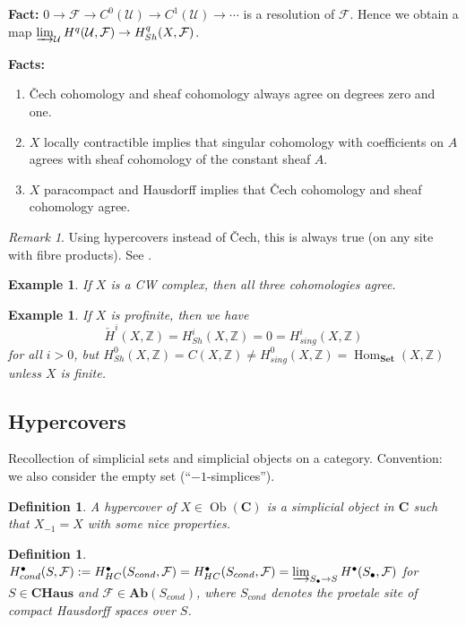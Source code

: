 \documentclass[12pt]{article}
\theoremstyle{darkgreentheorem}
\theoremstyle{darkbluedefinition}
\newtheorem{defn}[thm]{Definition}
\theoremstyle{darkredexample}
\newtheorem{exa}[thm]{Example}
\theoremstyle{remark}
\newtheorem{rem}[thm]{Remark}
\newcommand{\Z}{\mathbb{Z}}
\newcommand{\1}{\mathbbm{1}}
\newcommand{\bfC}{\mathbf{C}}
\newcommand{\CHaus}{\mathbf{CHaus}}
\newcommand{\Ab}{\mathbf{Ab}}
\newcommand{\Set}{\mathbf{Set}}
\newcommand{\F}{\mathcal{F}}
\newcommand{\U}{\mathcal{U}}
\DeclareMathOperator{\Hom}{Hom}
\DeclareMathOperator{\Ob}{Ob}
\newcommand{\grd}{^{\bullet}}
\begin{document}
\textbf{Fact:} $0\to \F\to C^{0}(\U) \to C^{1}(\U)\to \cdots $ is a resolution of $\F$.
Hence  we obtain a map $\varinjlim_{\U}H^{q}(\U,\F)\to H^{q}_{Sh}(X,\F)$.

\textbf{Facts:}
\begin{enumerate}[label=\arabic*)]
    \item \v{C}ech cohomology and sheaf cohomology always agree on degrees zero and one.
    \item $X$ locally contractible implies that singular cohomology with coefficients on $A$ agrees with sheaf cohomology of the constant sheaf $A$.
    \item $X$ paracompact and Hausdorff implies that \v{C}ech cohomology and sheaf cohomology agree.
\end{enumerate}

\begin{rem}
    Using hypercovers instead of \v{C}ech, this is always true (on any site with fibre products).
    See \cite[\href{https://stacks.math.columbia.edu/tag/01H0}{Tag 01H0}]{sta19}.
\end{rem}

\begin{exa}
    If $X$ is a CW complex, then all three cohomologies agree.
\end{exa}

\begin{exa}
    If $X$ is profinite, then we have
    \[ \check{H}^{i}(X,\Z)=H^{i}_{Sh}(X,\Z)=0=H^{i}_{sing}(X,\Z) \]
    for all $i>0$, but $H^{0}_{Sh}(X,\Z)=C(X,\Z)\neq H^{0}_{sing}(X,\Z)=\Hom_{\Set}(X,\Z)$ unless $X$ is finite.
\end{exa}

\subsection{Hypercovers}

Recollection of simplicial sets and simplicial objects on a category.
Convention: we also consider the empty set (``$-1$-simplices'').

\begin{defn}
    A \textit{hypercover} of $X\in \Ob(\bfC)$ is a simplicial object in $\bfC$ such that $X_{-1}=X$ with some nice properties.
\end{defn}

\begin{defn}
    $H_{cond}\grd(S,\F):=H\grd_{HC}(S_{cond},\F)=H\grd_{HC}(S_{cond},\F)=\varinjlim_{S_{\bullet}\to S}H\grd(S_{\bullet},\F)$ for $S\in \CHaus$ and $\F\in \Ab(S_{cond})$, where $S_{cond}$ denotes the proetale site of compact Hausdorff spaces over $S$.
\end{defn}
\end{document}

